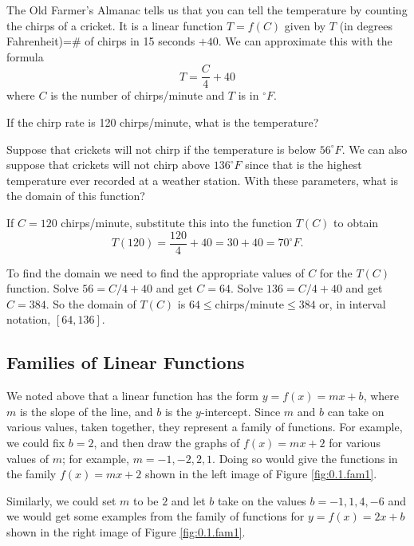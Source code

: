 


\bex
The Old Farmer's Almanac tells us that you can tell the temperature by counting the chirps
of a cricket.  It is a linear function $T=f(C)$ given by $T$ (in degrees Fahrenheit)=\# of
chirps in 15 seconds $+40$.  We can approximate this with the formula 
\[ T =  \frac{C}{4} + 40 \]
where $C$ is the number of chirps/minute and $T$ is in $^\circ F$.
\ba
    \item If the chirp rate is 120 chirps/minute, what is the temperature?
    \item Suppose that crickets will not chirp if the temperature is below $56^\circ F$.
        We can also suppose that crickets will not chirp above $136^\circ F$ since that is
        the highest temperature ever recorded at a weather station.  With these
        parameters, what is the domain of this function?
\ea
\eex
\ba
    \item If $C = 120$ chirps/minute, substitute this into the function $T(C)$ to obtain
        \[ T(120) = \frac{120}{4} + 40 = 30 + 40 = 70^\circ F. \]
    \item To find the domain we need to find the appropriate values of $C$ for the $T(C)$
        function.  Solve $56=C/4+40$ and get $C = 64$.  Solve $136=C/4+40$ and get $C =
        384$.  So the domain of $T(C)$ is $64 \le \text{chirps/minute} \le 384$ or, in
        interval notation, $[64, 136]$. 

\ea
\afterex


\subsection*{Families of Linear Functions}
We noted above that a linear function has the form  $y=f(x)=mx+b$, where $m$ is the slope of
the line, and $b$ is the $y$-intercept.  Since $m$ and $b$ can take on various values, taken
together, they represent a family of functions.  For example, we could fix $b = 2$, and then
draw the graphs of $f(x)=mx+2$ for various values of $m$; for example, $m = -1, -2, 2, 1$.
Doing so would give the functions in the family $f(x)=mx+2$ shown in the left image of Figure
\ref{fig:0.1.fam1}.

Similarly, we could set $m$ to be $2$ and let $b$ take on the values $b=-1, 1, 4, -6$ and
we would get
some examples from the family of functions for $y=f(x)=2x+b$ shown in the right image of Figure
\ref{fig:0.1.fam1}.


